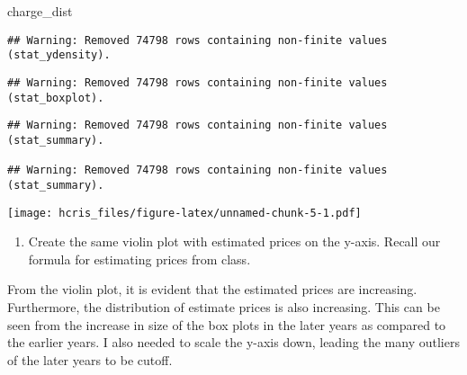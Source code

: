 \documentclass[
]{article}
\newenvironment{Shaded}{\begin{snugshade}}{\end{snugshade}}
\newcommand{\NormalTok}[1]{#1}
\providecommand{\tightlist}{%
  \setlength{\itemsep}{0pt}\setlength{\parskip}{0pt}}
\begin{document}
\begin{Shaded}
\begin{Highlighting}[]
\NormalTok{ charge\_dist}
\end{Highlighting}
\end{Shaded}

\begin{verbatim}
## Warning: Removed 74798 rows containing non-finite values (stat_ydensity).
\end{verbatim}

\begin{verbatim}
## Warning: Removed 74798 rows containing non-finite values (stat_boxplot).
\end{verbatim}

\begin{verbatim}
## Warning: Removed 74798 rows containing non-finite values (stat_summary).

## Warning: Removed 74798 rows containing non-finite values (stat_summary).
\end{verbatim}

\texttt{[image: hcris\_files/figure-latex/unnamed-chunk-5-1.pdf]}

\begin{enumerate}
\def\labelenumi{\arabic{enumi}.}
\setcounter{enumi}{4}
\tightlist
\item
  Create the same violin plot with estimated prices on the y-axis.
  Recall our formula for estimating prices from class.
\end{enumerate}

From the violin plot, it is evident that the estimated prices are
increasing. Furthermore, the distribution of estimate prices is also
increasing. This can be seen from the increase in size of the box plots
in the later years as compared to the earlier years. I also needed to
scale the y-axis down, leading the many outliers of the later years to
be cutoff.
\end{document}

